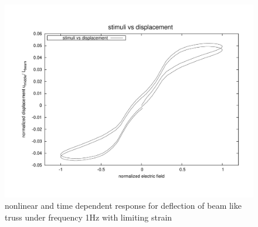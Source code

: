 \begin{figure}  
\centering
\includegraphics[width=5.0in]{./chap_5_active_trusses/images_non_linear_time_dependent_constitutive_equatio/limiting_strain_linear_tetrahedral_time_dependent_efield_vs_displacement_nonlinear.pdf}
\caption{nonlinear and time dependent response for deflection of beam like truss under frequency 1Hz with limiting strain}
\label{fig:limiting_strain_linear_tetrahedral_time_dependent_efield_vs_displacement_nonlinear}
\end{figure} 

